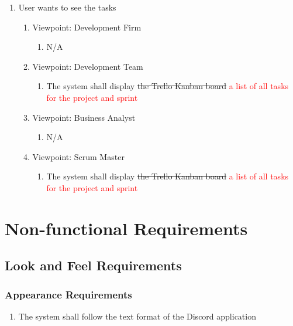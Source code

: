 \documentclass[12pt, titlepage]{article}
\begin{document}
\begin{enumerate}[{BE}1.]
    \item User wants to see the tasks
    \begin{enumerate}[{VP}1.] 
        \item Viewpoint: Development Firm
            \begin{enumerate}
                \item[] N/A
            \end{enumerate}
        \item Viewpoint: Development Team
            \begin{enumerate}
                \item The system shall display \sout{the Trello Kanban board} \textcolor{red}{a list of all tasks for the project and sprint}
            \end{enumerate}
        \item Viewpoint: Business Analyst
            \begin{enumerate}
                \item[] N/A
            \end{enumerate}
        \item Viewpoint: Scrum Master
            \begin{enumerate}
                \item The system shall display \sout{the Trello Kanban board} \textcolor{red}{a list of all tasks for the project and sprint}
            \end{enumerate}
    \end{enumerate}
\end{enumerate}


\section{Non-functional Requirements}

\subsection{Look and Feel Requirements}
\subsubsection{Appearance Requirements}
\begin{enumerate}[start=1, label={LF\arabic*.}]
    \item The system shall follow the text format of the Discord application
\end{enumerate}
\end{document}
